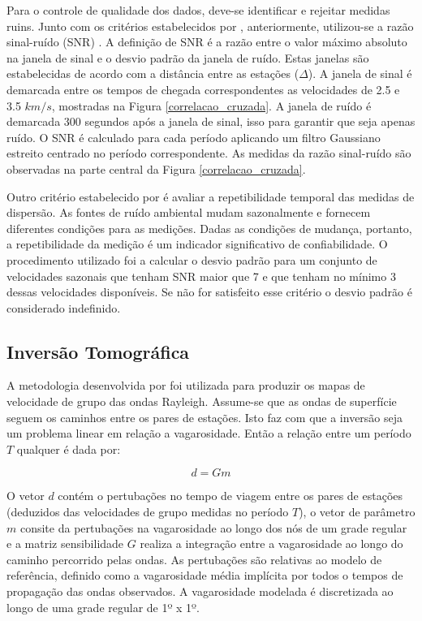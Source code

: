 Para o controle de qualidade dos dados, deve-se identificar e rejeitar medidas ruins. Junto com os critérios estabelecidos por \cite{bensen_processing_2007}, anteriormente, utilizou-se a razão sinal-ruído (SNR) . A definição de SNR é a razão entre o valor máximo absoluto na janela de sinal e o desvio padrão da janela de ruído. Estas janelas são estabelecidas de acordo com a distância entre as estações ($\Delta$). A janela de sinal é demarcada entre os tempos de chegada correspondentes as velocidades de 2.5 e 3.5 $km/s$, mostradas na Figura \ref{correlacao_cruzada}. A janela de ruído é demarcada 300 segundos após a janela de sinal, isso para garantir que seja apenas ruído. O SNR é calculado para cada período aplicando um filtro Gaussiano estreito centrado no período correspondente. As medidas da razão sinal-ruído são observadas na parte central da Figura \ref{correlacao_cruzada}. 

Outro critério estabelecido por \cite{bensen_processing_2007} é avaliar a repetibilidade temporal das medidas de dispersão. As fontes de ruído ambiental mudam sazonalmente e fornecem diferentes condições
para as medições. Dadas as condições de mudança, portanto, a repetibilidade da medição é um indicador significativo de confiabilidade. O procedimento utilizado foi a calcular o desvio padrão para um conjunto de velocidades sazonais que tenham SNR maior que 7 e que tenham no mínimo 3 dessas velocidades disponíveis. Se não for satisfeito esse critério o desvio padrão é considerado indefinido.

\subsection{Inversão Tomográfica}

A metodologia desenvolvida por  \cite{barmin_fast_2001} foi utilizada para produzir os mapas de velocidade de grupo das ondas Rayleigh. Assume-se que as ondas de superfície seguem os caminhos entre os pares de estações. Isto faz com que a inversão seja um problema linear em relação a vagarosidade. Então a relação entre um período $T$ qualquer é dada por:

\begin{equation}
d=Gm
\end{equation} 

O vetor $d$ contém o pertubações no tempo de viagem entre os pares de estações (deduzidos das velocidades de grupo medidas no período $T$), o vetor de parâmetro $m$ consite da pertubações na vagarosidade ao longo dos nós de um grade regular e a matriz sensibilidade $G$ realiza a integração entre a vagarosidade ao longo do caminho percorrido pelas ondas. As pertubações são relativas ao modelo de referência, definido como a vagarosidade média implícita por todos o tempos de propagação das ondas observados. A vagarosidade modelada é discretizada ao longo de uma grade regular de 1º x 1º. 

